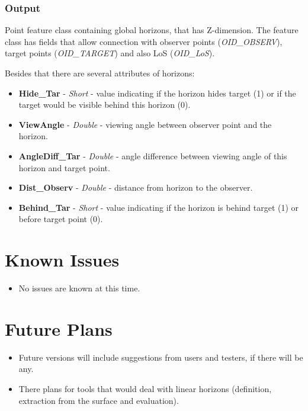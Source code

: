 \documentclass[]{article}
\begin{document}
\subsubsection{Output}

Point feature class containing global horizons, that has Z-dimension. The feature class has fields that allow connection with observer points (\textit{OID\_OBSERV}), target points (\textit{OID\_TARGET}) and also LoS (\textit{OID\_LoS}). 

Besides that there are several attributes of horizons:
\begin{itemize}
	\item \textbf{Hide\_Tar} - \textit{Short} - value indicating if the horizon hides target (1) or if the target would be visible behind this horizon (0).
	\item \textbf{ViewAngle} - \textit{Double} - viewing angle between observer point and the horizon.
	\item \textbf{AngleDiff\_Tar} - \textit{Double} - angle difference between viewing angle of this horizon and target point. 
	\item \textbf{Dist\_Observ} - \textit{Double} - distance from horizon to the observer.
	\item \textbf{Behind\_Tar} - \textit{Short} - value indicating if the horizon is behind target (1) or before target point (0).
\end{itemize}

\section{Known Issues}

\begin{itemize}
	\item No issues are known at this time.
\end{itemize}

\section{Future Plans}

\begin{itemize}
	\item Future versions will include suggestions from users and testers, if there will be any.
	\item There plans for tools that would deal with linear horizons (definition, extraction from the surface and evaluation).
\end{itemize}
\end{document}
